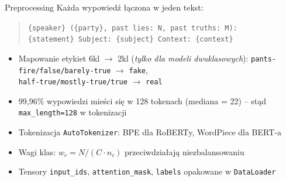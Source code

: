 \documentclass[10pt]{beamer}
\begin{document}
\begin{frame}{Preprocessing}
  Każda wypowiedź łączona w jeden tekst:
  \begin{quote}\small
    \texttt{\{speaker\} (\{party\}, past lies: N, past truths: M):\\
    \{statement\} Subject: \{subject\} Context: \{context\}}
  \end{quote}

  \begin{itemize}
    \item Mapowanie etykiet 6kl $\to$ 2kl (\emph{tylko dla modeli dwuklasowych}):
          \texttt{pants-fire/false/barely-true} $\to$ \texttt{fake},\\
          \texttt{half-true/mostly-true/true} $\to$ \texttt{real}
    \item 99{,}96\% wypowiedzi mieści się w 128 tokenach (mediana = 22) --
          stąd \texttt{max\_length=128} w tokenizacji
    \item Tokenizacja \texttt{AutoTokenizer}: BPE dla RoBERTy, WordPiece dla BERT-a
    \item Wagi klas: $w_c = N/(C \cdot n_c)$
          przeciwdziałają niezbalansowaniu
    \item Tensory \texttt{input\_ids}, \texttt{attention\_mask}, \texttt{labels}
          opakowane w \texttt{DataLoader}
  \end{itemize}
\end{frame}
\end{document}
